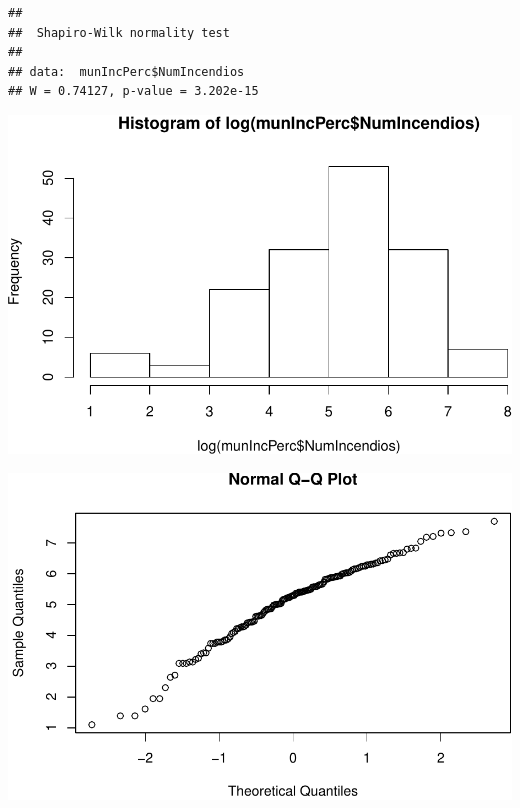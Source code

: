 \documentclass[11pt,]{article}
\newenvironment{Shaded}{\begin{snugshade}}{\end{snugshade}}
\newcommand{\KeywordTok}[1]{\textcolor[rgb]{0.13,0.29,0.53}{\textbf{#1}}}
\newcommand{\OperatorTok}[1]{\textcolor[rgb]{0.81,0.36,0.00}{\textbf{#1}}}
\newcommand{\NormalTok}[1]{#1}
\begin{document}
\begin{Shaded}
\end{Shaded}

\begin{verbatim}
## 
##  Shapiro-Wilk normality test
## 
## data:  munIncPerc$NumIncendios
## W = 0.74127, p-value = 3.202e-15
\end{verbatim}

\begin{Shaded}
\end{Shaded}

\includegraphics{proyecto_files/figure-latex/unnamed-chunk-49-3.pdf}

\begin{Shaded}
\end{Shaded}

\includegraphics{proyecto_files/figure-latex/unnamed-chunk-49-4.pdf}
\end{document}
